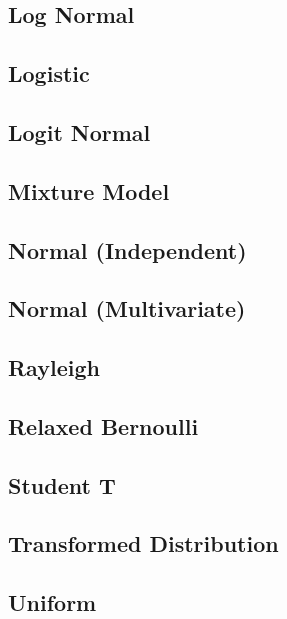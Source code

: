 \subsection{Log Normal}
\subsection{Logistic}
\subsection{Logit Normal}
\subsection{Mixture Model}
\subsection{Normal (Independent)}
\subsection{Normal (Multivariate)}
\subsection{Rayleigh}
\subsection{Relaxed Bernoulli}
\subsection{Student T}
\subsection{Transformed Distribution}
\subsection{Uniform}
